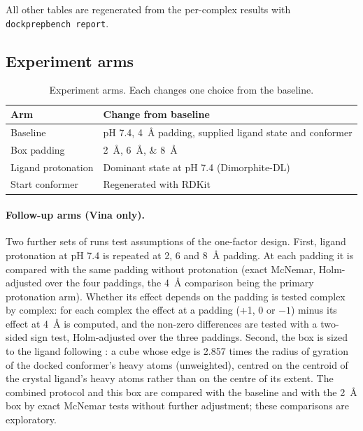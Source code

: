 All other tables are regenerated from the per-complex results with \texttt{dockprepbench report}.

\subsection{Experiment arms}

\begin{table}[h]
  \centering
  \caption{Experiment arms. Each changes one choice from the baseline.}
  \label{tab:arms}
  \begin{tabular}{ll}
    \toprule
    Arm & Change from baseline \\
    \midrule
    Baseline & pH 7.4, \SI{4}{\angstrom} padding, supplied ligand state and conformer \\
    Box padding & \SIlist{2;6;8}{\angstrom} \\
    Ligand protonation & Dominant state at pH 7.4 (Dimorphite-DL) \\
    Start conformer & Regenerated with RDKit \\
    \bottomrule
  \end{tabular}
\end{table}

\paragraph{Follow-up arms (Vina only).} Two further sets of runs test assumptions of the
one-factor design. First, ligand protonation at pH 7.4 is repeated at 2, 6 and
\SI{8}{\angstrom} padding. At each padding it is compared with the same padding without
protonation (exact McNemar, Holm-adjusted over the four paddings, the \SI{4}{\angstrom}
comparison being the primary protonation arm). Whether its effect depends on the padding is
tested complex by complex: for each complex the effect at a padding (+1, 0 or $-1$) minus its
effect at \SI{4}{\angstrom} is computed, and the non-zero differences are tested with a
two-sided sign test, Holm-adjusted over the three paddings. Second, the box is sized to the
ligand following \citet{feinstein2015boxsize}: a cube whose edge is 2.857 times the radius of
gyration of the docked conformer's heavy atoms (unweighted), centred on the centroid of the
crystal ligand's heavy atoms rather than on the centre of its extent. The combined protocol
and this box are compared with the baseline and with the \SI{2}{\angstrom} box by exact
McNemar tests without further adjustment; these comparisons are exploratory.


